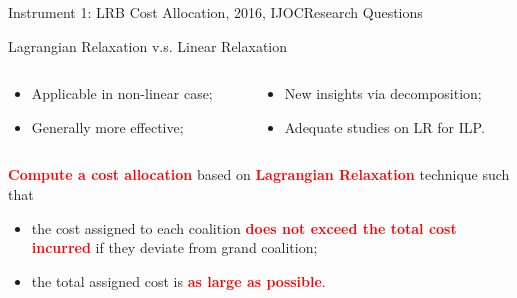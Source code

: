 \documentclass[14pt]{beamer}
\begin{document}
\begin{frame}{Instrument 1: LRB Cost Allocation, {\footnotesize 2016, IJOC}}{Research Questions}
\vspace{-5mm}
\begin{shaded}
\centering
Lagrangian Relaxation v.s. Linear Relaxation
\end{shaded}
\vspace{-5mm}
\begin{columns}
\begin{column}{5.5cm}
\begin{itemize}
\footnotesize
\item Applicable in non-linear case;
\item Generally more effective;
\end{itemize}
\end{column}
\begin{column}{8cm}
\begin{itemize}
\footnotesize
\item New insights via decomposition;
\item Adequate studies on LR for ILP.
\end{itemize}
\end{column}
\end{columns}
\begin{shaded}
\small
\textcolor{red}{\bf Compute a cost allocation} based on \textcolor{red}{\bf Lagrangian Relaxation} technique such that
\begin{itemize}
\item  the cost assigned to each coalition \textcolor{red}{\bf  does not exceed the total cost incurred} if they deviate from grand coalition;
\item the total assigned cost is \textcolor{red}{\bf as large as possible}.
\end{itemize}
\vspace{-2mm}
\end{shaded}
\end{frame}
\end{document}
